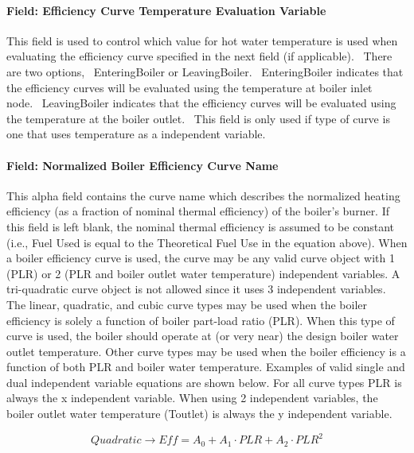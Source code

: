 \paragraph{Field: Efficiency Curve Temperature Evaluation Variable}\label{field-efficiency-curve-temperature-evaluation-variable}

This field is used to control which value for hot water temperature is used when evaluating the efficiency curve specified in the next field (if applicable).~ There are two options,~ EnteringBoiler or LeavingBoiler.~ EnteringBoiler indicates that the efficiency curves will be evaluated using the temperature at boiler inlet node.~ LeavingBoiler indicates that the efficiency curves will be evaluated using the temperature at the boiler outlet.~ This field is only used if type of curve is one that uses temperature as a independent variable.

\paragraph{Field: Normalized Boiler Efficiency Curve Name}\label{field-normalized-boiler-efficiency-curve-name}

This alpha field contains the curve name which describes the normalized heating efficiency (as a fraction of nominal thermal efficiency) of the boiler's burner. If this field is left blank, the nominal thermal efficiency is assumed to be constant (i.e., Fuel Used is equal to the Theoretical Fuel Use in the equation above). When a boiler efficiency curve is used, the curve may be any valid curve object with 1 (PLR) or 2 (PLR and boiler outlet water temperature) independent variables. A tri-quadratic curve object is not allowed since it uses 3 independent variables. The linear, quadratic, and cubic curve types may be used when the boiler efficiency is solely a function of boiler part-load ratio (PLR). When this type of curve is used, the boiler should operate at (or very near) the design boiler water outlet temperature. Other curve types may be used when the boiler efficiency is a function of both PLR and boiler water temperature. Examples of valid single and dual independent variable equations are shown below. For all curve types PLR is always the x independent variable. When using 2 independent variables, the boiler outlet water temperature (Toutlet) is always the y independent variable.

\begin{equation}
    Quadratic \to Eff = {A_0} + {A_1}\cdot PLR + {A_2}\cdot PL{R^2}
\end{equation}


